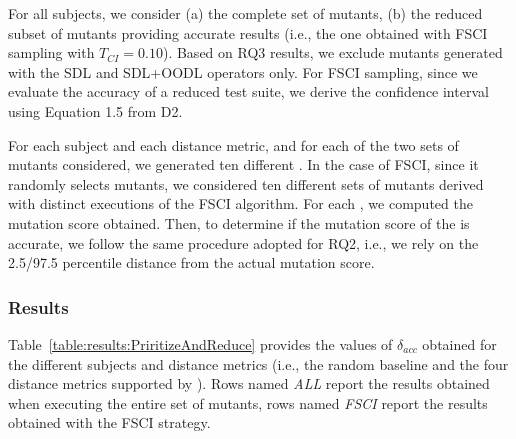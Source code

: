 For all subjects, we consider (a) the complete set of mutants, (b) the reduced subset of mutants providing accurate results (i.e., the one obtained with FSCI sampling with $T_{\mathit{CI}}=0.10$). 
Based on RQ3 results, we exclude mutants generated with the SDL and SDL+OODL operators only. 
For FSCI sampling, since we evaluate the accuracy of a reduced test suite, we derive the confidence interval using Equation 1.5 from D2. 


For each subject and each distance metric, and for each of the two sets of mutants considered, we generated ten different \MPTSs. In the case of FSCI, since it randomly selects mutants, we considered ten different sets of mutants derived with distinct executions of the FSCI algorithm. For each \MPTS, we computed the mutation score obtained. 
Then, to determine if the mutation score of the \MPTS is accurate, we follow the same procedure adopted for RQ2, i.e., we rely on the 2.5/97.5 percentile distance from the actual mutation score. 



\subsubsection{Results}




Table~\ref{table:results:PriritizeAndReduce} provides the values of $\delta_{acc}$ obtained for the different subjects and distance metrics (i.e., the random baseline and the four distance metrics supported by \APPR). Rows named \emph{ALL} report the results obtained when executing the entire set of mutants, rows named \emph{FSCI}  report the results obtained  with the FSCI strategy. 



